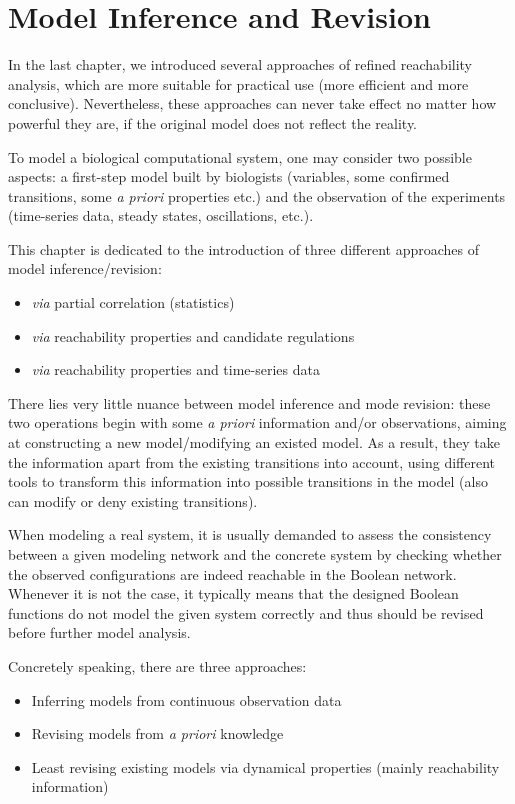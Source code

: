 \chapter{Model Inference and Revision}
\begin{mybox}
In the last chapter, we introduced several approaches of refined reachability analysis, which are more suitable for practical use (more efficient and more conclusive).
Nevertheless, these approaches can never take effect no matter how powerful they are, if the original model does not reflect the reality.

To model a biological computational system, one may consider two possible aspects: a first-step model built by biologists (variables, some confirmed transitions, some \textit{a priori} properties etc.) and the observation of the experiments (time-series data, steady states, oscillations, etc.).

This chapter is dedicated to the introduction of three different approaches of model inference/revision:

\begin{itemize}
    \item \textit{via} partial correlation (statistics)
    \item \textit{via} reachability properties and candidate regulations
    \item \textit{via} reachability properties and time-series data
\end{itemize}

There lies very little nuance between model inference and mode revision: these two operations begin with some \textit{a priori} information and/or observations, aiming at constructing a new model/modifying an existed model.
As a result, they take the information apart from the existing transitions into account, using different tools to transform this information into possible transitions in the model (also can modify or deny existing transitions).

\end{mybox}

When modeling a real system, it is usually demanded to assess the consistency between a given modeling network and the concrete system by checking whether the observed configurations are indeed reachable in the Boolean network.
Whenever it is not the case, it typically means that the designed Boolean functions do not model the given system correctly and thus should be revised before further model analysis.

Concretely speaking, there are three approaches:
\begin{itemize}
    \item Inferring models from continuous observation data
    \item Revising models from \textit{a priori} knowledge
    \item Least revising existing models via dynamical properties (mainly reachability information)
\end{itemize}

